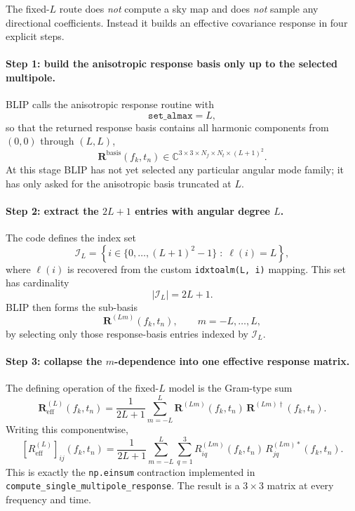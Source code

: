 \documentclass[11pt]{article}
\begin{document}
The fixed-$L$ route does \emph{not} compute a sky map and does \emph{not} sample any directional coefficients. Instead it builds an effective covariance response in four explicit steps.

\paragraph{Step 1: build the anisotropic response basis only up to the selected multipole.}
BLIP calls the anisotropic response routine with
\begin{equation}
\texttt{set\_almax}=L,
\end{equation}
so that the returned response basis contains all harmonic components from \((0,0)\) through \((L,L)\),
\begin{equation}
\mathbf{R}^{\mathrm{basis}}(f_k,t_n)
\in
\mathbb{C}^{3\times 3\times N_f\times N_t\times (L+1)^2}.
\end{equation}
At this stage BLIP has not yet selected any particular angular mode family; it has only asked for the anisotropic basis truncated at \(L\).

\paragraph{Step 2: extract the \(2L+1\) entries with angular degree \(L\).}
The code defines the index set
\begin{equation}
\mathcal{I}_L
=\left\{i \in \{0,\dots,(L+1)^2-1\} \;:\; \ell(i)=L\right\},
\end{equation}
where \(\ell(i)\) is recovered from the custom \texttt{idxtoalm(L, i)} mapping. This set has cardinality
\begin{equation}
|\mathcal{I}_L|=2L+1.
\end{equation}
BLIP then forms the sub-basis
\begin{equation}
\mathbf{R}^{(Lm)}(f_k,t_n), \qquad m=-L,\dots,L,
\end{equation}
by selecting only those response-basis entries indexed by \(\mathcal{I}_L\).

\paragraph{Step 3: collapse the \(m\)-dependence into one effective response matrix.}
The defining operation of the fixed-$L$ model is the Gram-type sum
\begin{equation}
\mathbf{R}^{(L)}_{\mathrm{eff}}(f_k,t_n)
=\frac{1}{2L+1}\sum_{m=-L}^{L}
\mathbf{R}^{(Lm)}(f_k,t_n)\,
\mathbf{R}^{(Lm)\dagger}(f_k,t_n).
\label{eq:fixedL-gram}
\end{equation}
Writing this componentwise,
\begin{equation}
\left[R^{(L)}_{\mathrm{eff}}\right]_{ij}(f_k,t_n)
=\frac{1}{2L+1}\sum_{m=-L}^{L}\sum_{q=1}^{3}
R^{(Lm)}_{iq}(f_k,t_n)\,
R^{(Lm)\ast}_{jq}(f_k,t_n).
\end{equation}
This is exactly the \texttt{np.einsum} contraction implemented in \texttt{compute\_single\_multipole\_response}. The result is a \(3\times 3\) matrix at every frequency and time.
\end{document}
